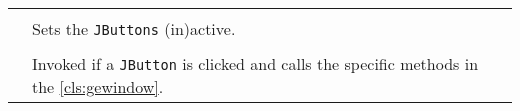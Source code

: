 \paragraph*{}
\begin{longtable}{Lp{10cm}}
	\startmethodtable
	 \\
	& Sets the \texttt{JButtons} (in)active. \\
	 \\
	& Invoked if a \texttt{JButton} is clicked and calls the specific methods in the \ref{cls:gewindow}. \\
	\hline
\end{longtable}
